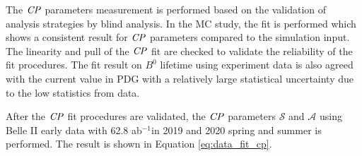  

The $\it{CP}$ parameters measurement is performed based on the validation of analysis strategies by blind analysis.  
In the MC study, the fit is performed which shows a consistent result for $\it{CP}$ parameters compared to the simulation input. The linearity and pull of the $\it{CP}$ fit are checked to validate the reliability of the fit procedures. The fit result on $B^0$ lifetime using experiment data is also agreed with the current value in PDG with a relatively large statistical uncertainty due to the low statistics from data.

After the $\it{CP}$ fit procedures are validated, the $\it{CP}$ parameters $\mathcal{S}$ and $\mathcal{A}$ using Belle II early data with 62.8 ab$^{-1}$in 2019 and 2020 spring and summer is performed. The result is shown in Equation \ref{eq:data_fit_cp}.

